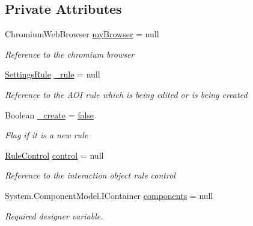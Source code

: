 \subsection*{Private Attributes}
\begin{DoxyCompactItemize}
\item 
Chromium\+Web\+Browser \hyperlink{class_web_analyzer_1_1_u_i_1_1_edit_rule_form_a13a68bf348e8745e5ea013dc3a3f4ea6}{my\+Browser} = null
\begin{DoxyCompactList}\small\item\em Reference to the chromium browser \end{DoxyCompactList}\item 
\hyperlink{class_web_analyzer_1_1_models_1_1_settings_model_1_1_settings_rule}{Settings\+Rule} \hyperlink{class_web_analyzer_1_1_u_i_1_1_edit_rule_form_ac499572f8fdddf891c36254e9701f754}{\+\_\+rule} = null
\begin{DoxyCompactList}\small\item\em Reference to the A\+O\+I rule which is being edited or is being created \end{DoxyCompactList}\item 
Boolean \hyperlink{class_web_analyzer_1_1_u_i_1_1_edit_rule_form_a72f32003adafdc9ead00b22eefbf647b}{\+\_\+create} = \hyperlink{_u_i_2_h_t_m_l_resources_2js_2src_2export_8js_ae6c865df784842196d411c1466b01686}{false}
\begin{DoxyCompactList}\small\item\em Flag if it is a new rule \end{DoxyCompactList}\item 
\hyperlink{class_web_analyzer_1_1_u_i_1_1_interaction_objects_1_1_rule_control}{Rule\+Control} \hyperlink{class_web_analyzer_1_1_u_i_1_1_edit_rule_form_a9d1ff11c0ffd1f01406c687f6b10a873}{control} = null
\begin{DoxyCompactList}\small\item\em Reference to the interaction object rule control \end{DoxyCompactList}\item 
System.\+Component\+Model.\+I\+Container \hyperlink{class_web_analyzer_1_1_u_i_1_1_edit_rule_form_ab218f619b261a307316cbb5b01a79c1b}{components} = null
\begin{DoxyCompactList}\small\item\em Required designer variable. \end{DoxyCompactList}\end{DoxyCompactItemize}


